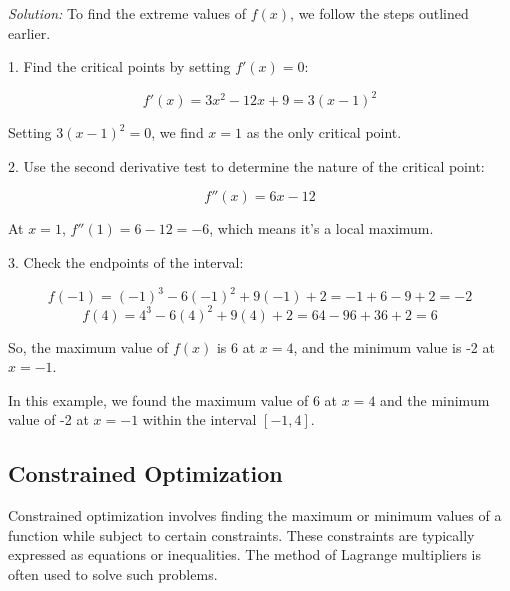 \documentclass[a4paper,12pt]{book}
\newcounter{problem}
\newenvironment{solution}[1][]
{\par\noindent\textit{Solution:} \rmfamily}{\medskip}
\newcounter{example}
\begin{document}
\begin{solution}
To find the extreme values of \(f(x)\), we follow the steps outlined earlier.

1. Find the critical points by setting \(f'(x) = 0\):

\[
f'(x) = 3x^2 - 12x + 9 = 3(x - 1)^2
\]

Setting \(3(x - 1)^2 = 0\), we find \(x = 1\) as the only critical point.

2. Use the second derivative test to determine the nature of the critical point:

\[
f''(x) = 6x - 12
\]

At \(x = 1\), \(f''(1) = 6 - 12 = -6\), which means it's a local maximum.

3. Check the endpoints of the interval:

\[
f(-1) = (-1)^3 - 6(-1)^2 + 9(-1) + 2 = -1 + 6 - 9 + 2 = -2
\]
\[
f(4) = 4^3 - 6(4)^2 + 9(4) + 2 = 64 - 96 + 36 + 2 = 6
\]

So, the maximum value of \(f(x)\) is 6 at \(x = 4\), and the minimum value is -2 at \(x = -1\).

\begin{center}
\end{center}

In this example, we found the maximum value of 6 at \(x = 4\) and the minimum value of -2 at \(x = -1\) within the interval \([-1, 4]\).
\end{solution}

\subsection{Constrained Optimization}

Constrained optimization involves finding the maximum or minimum values of a function while subject to certain constraints. These constraints are typically expressed as equations or inequalities. The method of Lagrange multipliers is often used to solve such problems.
\end{document}
